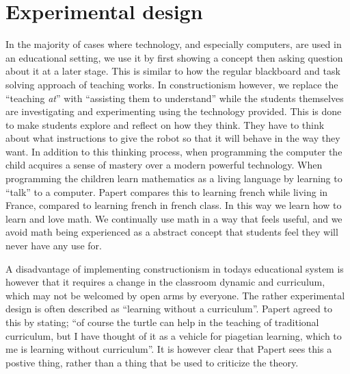 \section{Experimental design}
In the majority of cases where technology, and especially computers, are used in an educational setting, we use it by first showing a concept then asking question about it at a later stage. 
This is similar to how the regular blackboard and task solving approach of teaching works. 
In constructionism however, we replace the "`teaching \textit{at}"' with "`assisting them to understand"' while the students themselves are investigating and experimenting using the technology provided. 
This is done to make students explore and reflect on how they think. They have to think about what instructions to give the robot so that it will behave in the way they want. In addition to this thinking process, when programming the computer the child acquires a sense of mastery over a modern powerful technology. When programming the children learn mathematics as a living language by learning to ``talk'' to a computer. Papert compares this to learning french while living in France, compared to learning french in french class. In this way we learn how to learn and love math. We continually use math in a way that feels useful, and we avoid math being experienced as a abstract concept that students feel they will never have any use for. 

\bigskip\noindent
A disadvantage of implementing constructionism in todays educational system is however that it requires a change in the classroom dynamic and curriculum, which may not be welcomed by open arms by everyone. 
The rather experimental design is often described as ``learning without a curriculum''. Papert agreed to this by stating; ``of course the turtle can help in the teaching of traditional curriculum, but I have thought of it as a vehicle for piagetian learning, which to me is learning without curriculum''. It is however clear that Papert sees this a postive thing, rather than a thing that be used to criticize the theory. 

